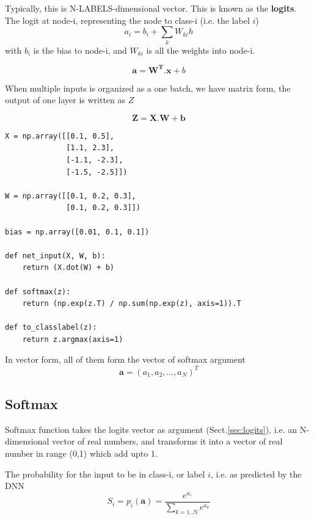 Typically, this is N-LABELS-dimensional vector. This is known as the {\bf
logits}. The logit at node-i, representing the node to class-i (i.e. the label $i$)
\begin{equation}
a_i = b_i + \sum_k W_{ki} h 
\end{equation}
with $b_i$ is the bias to node-i, and $W_{ki}$ is all the weights into node-i.

\begin{equation}
\mathbf{a = W^T . x} + b
\end{equation}

\begin{mdframed}

When multiple inputs is organized as a one batch, we have matrix form, the
output of one layer is written as $Z$

\begin{equation}
\mathbf{Z = X.W + b}
\end{equation}

\begin{verbatim}
X = np.array([[0.1, 0.5],
              [1.1, 2.3],
              [-1.1, -2.3],
              [-1.5, -2.5]])

W = np.array([[0.1, 0.2, 0.3],
              [0.1, 0.2, 0.3]])

bias = np.array([0.01, 0.1, 0.1])

def net_input(X, W, b):
    return (X.dot(W) + b)
    
def softmax(z):
    return (np.exp(z.T) / np.sum(np.exp(z), axis=1)).T
    
def to_classlabel(z):
    return z.argmax(axis=1)
\end{verbatim}
\end{mdframed}

In vector form, all of them form the vector of softmax argument
\begin{equation}
\mathbf{a} = (a_1, a_2, \ldots, a_N)^T
\end{equation}

\subsection{Softmax}
\label{sec:softmax}


Softmax function takes the logits vector as argument (Sect.\ref{sec:logits}),
i.e. an N-dimensional vector of real numbers, and transforms it into a vector of
real number in range (0,1) which add upto 1.

The probability for the input to be in class-i, or label $i$, i.e. as predicted by the DNN 
\begin{equation}
S_i = p_i(\mathbf{a}) = \frac{e^{a_i}}{\sum_{k=1..N}e^{a_k}}
\end{equation}

